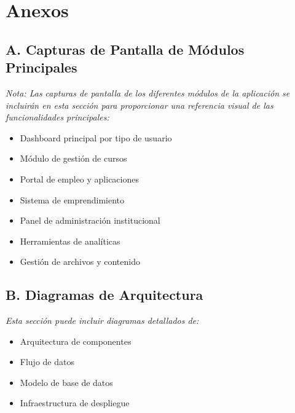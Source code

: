 \documentclass[12pt,a4paper]{article}
\begin{document}
\newpage
\section{Anexos}

\subsection{A. Capturas de Pantalla de Módulos Principales}

\textit{Nota: Las capturas de pantalla de los diferentes módulos de la aplicación se incluirán en esta sección para proporcionar una referencia visual de las funcionalidades principales:}

\begin{itemize}
    \item Dashboard principal por tipo de usuario
    \item Módulo de gestión de cursos
    \item Portal de empleo y aplicaciones
    \item Sistema de emprendimiento
    \item Panel de administración institucional
    \item Herramientas de analíticas
    \item Gestión de archivos y contenido
\end{itemize}

\subsection{B. Diagramas de Arquitectura}

\textit{Esta sección puede incluir diagramas detallados de:}

\begin{itemize}
    \item Arquitectura de componentes
    \item Flujo de datos
    \item Modelo de base de datos
    \item Infraestructura de despliegue
\end{itemize}
\end{document}

